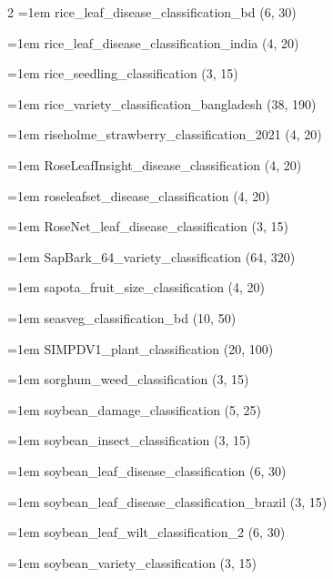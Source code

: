 \begin{multicols}{2}
\hangindent=1em rice\_\allowbreak{}leaf\_\allowbreak{}disease\_\allowbreak{}classification\_\allowbreak{}bd (6, 30)\par
\hangindent=1em rice\_\allowbreak{}leaf\_\allowbreak{}disease\_\allowbreak{}classification\_\allowbreak{}india (4, 20)\par
\hangindent=1em rice\_\allowbreak{}seedling\_\allowbreak{}classification (3, 15)\par
\hangindent=1em rice\_\allowbreak{}variety\_\allowbreak{}classification\_\allowbreak{}bangladesh (38, 190)\par
\hangindent=1em riseholme\_\allowbreak{}strawberry\_\allowbreak{}classification\_\allowbreak{}2021 (4, 20)\par
\hangindent=1em RoseLeafInsight\_\allowbreak{}disease\_\allowbreak{}classification (4, 20)\par
\hangindent=1em roseleafset\_\allowbreak{}disease\_\allowbreak{}classification (4, 20)\par
\hangindent=1em RoseNet\_\allowbreak{}leaf\_\allowbreak{}disease\_\allowbreak{}classification (3, 15)\par
\hangindent=1em SapBark\_\allowbreak{}64\_\allowbreak{}variety\_\allowbreak{}classification (64, 320)\par
\hangindent=1em sapota\_\allowbreak{}fruit\_\allowbreak{}size\_\allowbreak{}classification (4, 20)\par
\hangindent=1em seasveg\_\allowbreak{}classification\_\allowbreak{}bd (10, 50)\par
\hangindent=1em SIMPDV1\_\allowbreak{}plant\_\allowbreak{}classification (20, 100)\par
\hangindent=1em sorghum\_\allowbreak{}weed\_\allowbreak{}classification (3, 15)\par
\hangindent=1em soybean\_\allowbreak{}damage\_\allowbreak{}classification (5, 25)\par
\hangindent=1em soybean\_\allowbreak{}insect\_\allowbreak{}classification (3, 15)\par
\hangindent=1em soybean\_\allowbreak{}leaf\_\allowbreak{}disease\_\allowbreak{}classification (6, 30)\par
\hangindent=1em soybean\_\allowbreak{}leaf\_\allowbreak{}disease\_\allowbreak{}classification\_\allowbreak{}brazil (3, 15)\par
\hangindent=1em soybean\_\allowbreak{}leaf\_\allowbreak{}wilt\_\allowbreak{}classification\_\allowbreak{}2 (6, 30)\par
\hangindent=1em soybean\_\allowbreak{}variety\_\allowbreak{}classification (3, 15)\par

\end{multicols}
